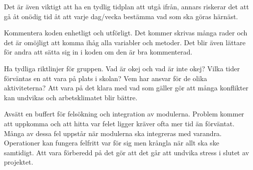 \documentclass[11pt]{article}
\begin{document}
Det är även viktigt att ha en tydlig tidplan att utgå ifrån, annars riskerar det att gå åt onödig tid åt att varje dag/vecka bestämma vad som ska göras härnäst.

Kommentera koden enhetligt och utförligt. Det kommer skrivas många rader och det är omöjligt att komma ihåg alla variabler och metoder. Det blir även lättare för andra att sätta sig in i koden om den är bra kommenterad. 

Ha tydliga riktlinjer för gruppen. Vad är okej och vad är inte okej? Vilka tider förväntas en att vara på plats i skolan? Vem har ansvar för de olika aktiviteterna? Att vara på det klara med vad som gäller gör att många konflikter kan undvikas och arbetsklimatet blir bättre.

Avsätt en buffert för felsökning och integration av modulerna. Problem kommer att uppkomma och att hitta var felet ligger kräver ofta mer tid än förväntat. Många av dessa fel uppstår när modulerna ska integreras med varandra. Operationer kan fungera felfritt var för sig men krångla när allt ska ske samtidigt. Att vara förberedd på det gör att det går att undvika stress i slutet av projektet. 
\end{document}
